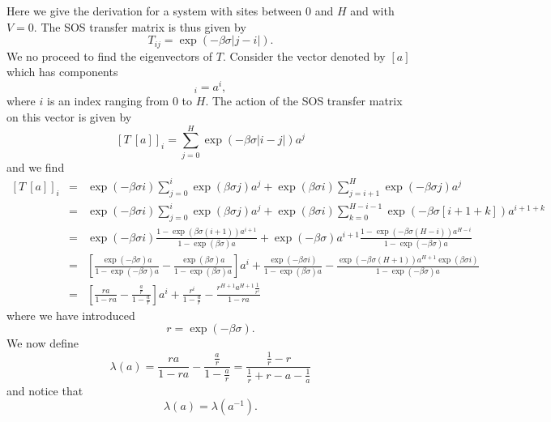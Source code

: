 Here we give the derivation for a system with sites between $0$ and $H$ and with $V=0$.  The SOS transfer matrix is thus given by 
\begin{equation}
T_{ij} = \exp(-\beta\sigma|j-i|).
\end{equation}
We no proceed to find the eigenvectors of $T$.  Consider the vector denoted by $[a]$ which has components
\begin{equation}
[a]_i = a^i,
\end{equation}
where $i$ is an index ranging from $0$ to $H$. 
The action of the SOS transfer matrix on this vector is given by
\begin{equation}
\left[T\ [a]\right]_i = \sum_{j=0}^H\exp(-\beta\sigma |i-j|)a^j
\end{equation}
and we find
\begin{eqnarray}
\left[T\ [a]\right]_i&=& \exp(-\beta\sigma i)\sum_{j=0}^i\exp(\beta\sigma j)a^j + \exp(\beta\sigma i)
\sum_{j= i+1}^H \exp(-\beta\sigma j)a^j\nonumber \\
&=&\exp(-\beta\sigma i)\sum_{j=0}^i\exp(\beta\sigma j)a^j + \exp(\beta\sigma i) \sum_{k= 0}^{H-i-1} \exp(-\beta\sigma [i+1+k])a^{i+1+k} \nonumber \\
&=& \exp(-\beta\sigma i)\frac{1-\exp(\beta\sigma (i+1))a^{i+1}}{1-\exp(\beta\sigma)a}
+ \exp(-\beta\sigma)a^{i+1}\frac{1- \exp(-\beta\sigma(H-i))a^{H-i}}{1-\exp(-\beta\sigma)a}\nonumber \\
&=& \left[\frac{\exp(-\beta\sigma) a}{1-\exp(-\beta\sigma)a}- \frac{\exp(\beta\sigma) a}{1-\exp(\beta\sigma)a}\right]a^i +\frac{\exp(-\beta\sigma i)}{1-\exp(\beta\sigma)a}-\frac{\exp(-\beta\sigma(H+1))a^{H+1}\exp(\beta\sigma i)}{1-\exp(-\beta\sigma)a}\nonumber\\
&=&\left[\frac{ ra}{1-ra}- \frac{ \frac{a}{r}}{1-\frac{a}{r}}\right]a^i +\frac{r^i}{1-\frac{a}{r}}-\frac{r^{H+1}a^{H+1}\frac{1}{r^i}}{1-ra}\nonumber
\end{eqnarray}
where we have introduced
\begin{equation}
r=\exp(-\beta\sigma).
\end{equation}
We now define
\begin{equation}
\lambda(a)= \frac{ ra}{1-ra}- \frac{ \frac{a}{r}}{1-\frac{a}{r}} = \frac{\frac{1}{r}-r}{\frac{1}{r}+r
- a-\frac{1}{a}}\label{elam}
\end{equation}
and notice that
\begin{equation}
\lambda(a) = \lambda(a^{-1}).
\end{equation}

